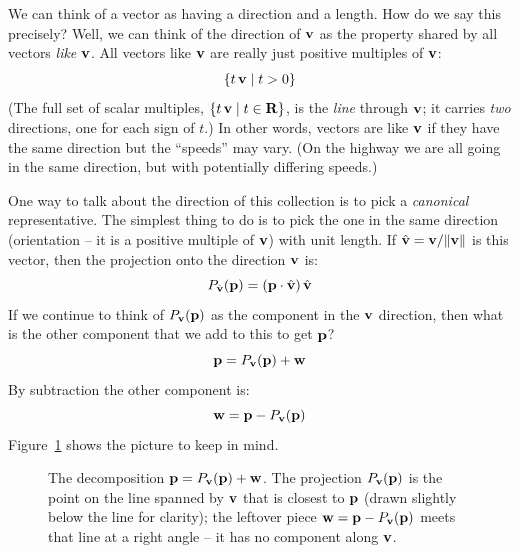 \documentclass[12pt]{article}
\begin{document}
We can think of a vector as having a direction and a length.
How do we say this precisely? Well, we can think of the direction
of ${\bf v}$ as the property shared by all vectors {\em like\/} ${\bf v}$.
All vectors like ${\bf v}$ are really just positive multiples of ${\bf v}$:
$$ \{ t \, {\bf v} \mid t > 0 \} $$
(The full set of scalar multiples, $\{ t \, {\bf v} \mid t \in {\bf R} \}$,
is the {\em line\/} through ${\bf v}$; it carries {\em two\/} directions,
one for each sign of $t$.)
In other words, vectors are like ${\bf v}$ if they have the same direction
but the ``speeds'' may vary.
(On the highway we are all going in the same direction, but with 
potentially differing speeds.)


One way to talk about the direction of this collection is to 
pick a {\em canonical\/} representative. The simplest thing to do is to 
pick the one in the same direction (orientation -- it is a positive 
multiple of ${\bf v}$) with unit length.
If $\hat{\bf v} = {\bf v} / \|{\bf v}\|$ is this vector, then the projection onto the direction ${\bf v}$ is:
$$ P_{\hat{\bf v}}({\bf p}) = \left({\bf p} \cdot \hat{\bf v}\right) \hat{\bf v}$$
If we continue to think of $P_{\bf v}({\bf p})$ as the component in the 
${\bf v}$ direction, then what is the other component that we add to this 
to get ${\bf p}$?
$$ {\bf p} = P_{{\bf v}}({\bf p}) + {\bf w} $$
By subtraction the other component is:
$$ {\bf w} = {\bf p} - P_{\bf v}({\bf p}) $$
Figure~\ref{fig:decomp} shows the picture to keep in mind.

\begin{figure}[ht]
\centering
{}
\caption{The decomposition ${\bf p} = P_{\bf v}({\bf p}) + {\bf w}$.  The
projection $P_{\bf v}({\bf p})$ is the point on the line spanned by
${\bf v}$ that is closest to ${\bf p}$ (drawn slightly below the line for
clarity); the leftover piece ${\bf w} = {\bf p} - P_{\bf v}({\bf p})$
meets that line at a right angle -- it has no component along ${\bf v}$.}
\label{fig:decomp}
\end{figure}
\end{document}
